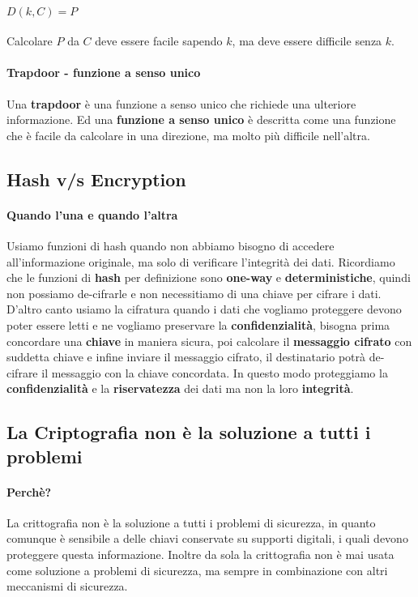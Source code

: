         \paragraph{$D(k,C)=P$} Calcolare $P$ da $C$ deve essere facile sapendo $k$, ma deve essere difficile senza $k$.
        \paragraph{Trapdoor - funzione a senso unico} Una \textbf{trapdoor} è una funzione a senso unico che richiede una ulteriore informazione. Ed una \textbf{funzione a senso unico} è descritta come una funzione che è facile da calcolare in una direzione, ma molto più difficile nell'altra.  
    \subsection{Hash v/s Encryption}
        \paragraph{Quando l'una e quando l'altra} Usiamo funzioni di hash quando non abbiamo bisogno di accedere all'informazione originale, ma solo di verificare l'integrità dei dati. Ricordiamo che le funzioni di \textbf{hash} per definizione sono \textbf{one-way} e \textbf{deterministiche}, quindi non possiamo de-cifrarle e non necessitiamo di una chiave per cifrare i dati. \newline
        D'altro canto usiamo la cifratura quando i dati che vogliamo proteggere devono poter essere letti e ne vogliamo preservare la \textbf{confidenzialità}, bisogna prima concordare una \textbf{chiave} in maniera sicura, poi calcolare il \textbf{messaggio cifrato} con suddetta chiave e infine inviare il messaggio cifrato, il destinatario potrà de-cifrare il messaggio con la chiave concordata. In questo modo proteggiamo la \textbf{confidenzialità} e la \textbf{riservatezza} dei dati ma non la loro \textbf{integrità}.
    \subsection{La Criptografia non è la soluzione a tutti i problemi}
        \paragraph{Perchè?} La crittografia non è la soluzione a tutti i problemi di sicurezza, in quanto comunque è sensibile a delle chiavi conservate su supporti digitali, i quali devono proteggere questa informazione. Inoltre da sola la crittografia non è mai usata come soluzione a problemi di sicurezza, ma sempre in combinazione con altri meccanismi di sicurezza.
